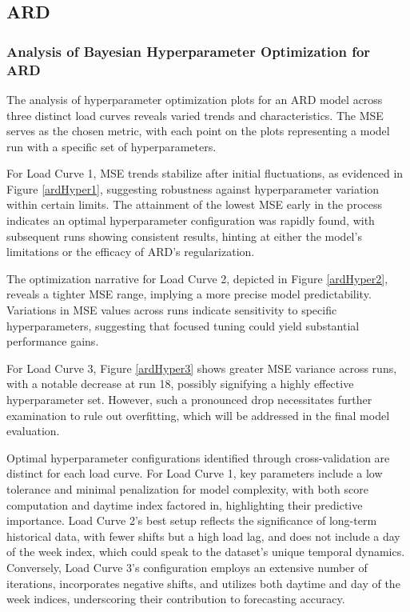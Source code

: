 \documentclass{article} %
\begin{document}
\subsection{ARD}
\subsubsection{Analysis of Bayesian Hyperparameter Optimization for ARD}
The analysis of hyperparameter optimization plots for an \gls{ARD} model across three distinct load curves reveals varied trends and characteristics. The \gls{MSE} serves as the chosen metric, with each point on the plots representing a model run with a specific set of hyperparameters. 


For Load Curve 1, \gls{MSE} trends stabilize after initial fluctuations, as evidenced in Figure \ref{ardHyper1}, suggesting robustness against hyperparameter variation within certain limits. The attainment of the lowest MSE early in the process indicates an optimal hyperparameter configuration was rapidly found, with subsequent runs showing consistent results, hinting at either the model's limitations or the efficacy of ARD's regularization.

The optimization narrative for Load Curve 2, depicted in Figure \ref{ardHyper2}, reveals a tighter \gls{MSE} range, implying a more precise model predictability. Variations in \gls{MSE} values across runs indicate sensitivity to specific hyperparameters, suggesting that focused tuning could yield substantial performance gains.

For Load Curve 3, Figure \ref{ardHyper3} shows greater \gls{MSE} variance across runs, with a notable decrease at run 18, possibly signifying a highly effective hyperparameter set. However, such a pronounced drop necessitates further examination to rule out overfitting, which will be addressed in the final model evaluation.

Optimal hyperparameter configurations identified through cross-validation are distinct for each load curve. For Load Curve 1, key parameters include a low tolerance and minimal penalization for model complexity, with both score computation and daytime index factored in, highlighting their predictive importance. Load Curve 2's best setup reflects the significance of long-term historical data, with fewer shifts but a high load lag, and does not include a day of the week index, which could speak to the dataset's unique temporal dynamics. Conversely, Load Curve 3's configuration employs an extensive number of iterations, incorporates negative shifts, and utilizes both daytime and day of the week indices, underscoring their contribution to forecasting accuracy.
\end{document}
